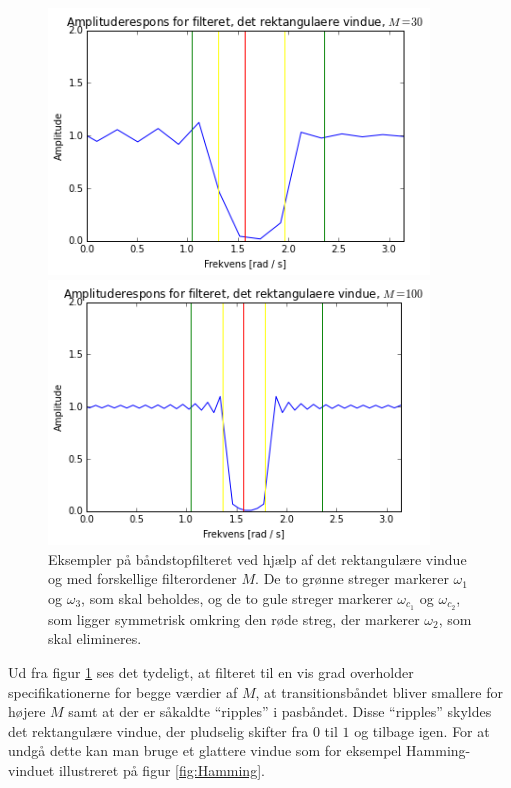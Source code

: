 \begin{figure}[H]
\begin{minipage}{0.49\textwidth}
\includegraphics[width=0.9\textwidth]{figures/Filter_rekt_30.PNG}
\end{minipage}
\begin{minipage}{0.49\textwidth}
\includegraphics[width=0.9\textwidth]{figures/Filter_rekt_100.PNG}
\end{minipage}
\caption{Eksempler på båndstopfilteret ved hjælp af det rektangulære vindue og med forskellige filterordener $M$. De to grønne streger markerer $\omega_1$ og $\omega_3$, som skal beholdes, og de to gule streger markerer $\omega_{c_1}$ og $\omega_{c_2}$, som ligger symmetrisk omkring den røde streg, der markerer $\omega_2$, som skal elimineres.}
\label{fig:filter_rekt}
\end{figure}

Ud fra figur \ref{fig:filter_rekt} ses det tydeligt, at filteret til en vis grad overholder specifikationerne for begge værdier af $M$, at transitionsbåndet bliver smallere for højere $M$ samt at der er såkaldte ``ripples'' i pasbåndet. Disse ``ripples'' skyldes det rektangulære vindue, der pludselig skifter fra $0$ til $1$ og tilbage igen. For at undgå dette kan man bruge et glattere vindue som for eksempel Hamming-vinduet illustreret på figur \ref{fig:Hamming}.